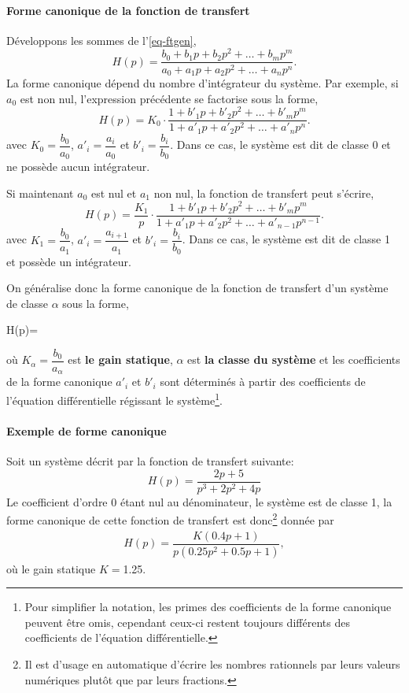 \paragraph{Forme canonique de la fonction de transfert}
Développons les sommes de l'\cref{eq-ftgen},
$$
H(p)=\dfrac{b_0+b_1p+b_2p^2+\ldots+b_mp^m}{a_0+a_1p+a_2p^2+\ldots+a_np^n}.
$$
La forme canonique dépend du nombre d'intégrateur du système. 
Par exemple, si $a_0$ est non nul, l'expression précédente se factorise sous la forme,
$$
H(p)=K_0\cdot\dfrac{1+b'_1p+b'_2p^2+\ldots+b'_mp^m}{1+a'_1p+a'_2p^2+\ldots+a'_np^n}.
$$
avec $K_0=\dfrac{b_0}{a_0}$, $a'_i=\dfrac{a_i}{a_0}$ et $b'_i=\dfrac{b_i}{b_0}$. 
Dans ce cas, le système est dit de classe 0 et ne possède aucun intégrateur.

Si maintenant $a_0$ est nul et $a_1$ non nul, la fonction de transfert peut s'écrire,
$$
H(p)=\dfrac{K_1}{p}\cdot\dfrac{1+b'_1p+b'_2p^2+\ldots+b'_mp^m}{1+a'_1p+a'_2p^2+\ldots+a'_{n-1}p^{n-1}}.
$$
avec $K_1=\dfrac{b_0}{a_1}$, $a'_i=\dfrac{a_{i+1}}{a_1}$ et $b'_i=\dfrac{b_i}{b_0}$.
Dans ce cas, le système est dit de classe 1 et possède un intégrateur.

On généralise donc la forme canonique de la fonction de transfert d'un système de classe $\alpha$ sous la forme,
\begin{bequation}
H(p)=\cdot{} \label{eq-ftcan} 
\end{bequation}
où $K_\alpha=\dfrac{b_0}{a_\alpha}$ est \textbf{le gain statique}, $\alpha$ est \textbf{la classe du système} 
et les coefficients de la forme canonique $a'_i$ et $b'_i$ sont déterminés à partir des coefficients 
de l'équation différentielle régissant le système\footnote{Pour simplifier la notation, 
les primes des coefficients de la forme canonique peuvent être omis, cependant 
ceux-ci restent toujours différents des coefficients de l'équation différentielle.}.

\paragraph{Exemple de forme canonique}
Soit un système décrit par la fonction de transfert suivante:
$$
H(p)=\dfrac{2p+5}{p^3+2p^2+4p}
$$
Le coefficient d'ordre 0 étant nul au dénominateur, le système est de classe 1, 
la forme canonique de cette fonction de transfert est 
donc\footnote{Il est d'usage en automatique d'écrire les nombres rationnels 
par leurs valeurs numériques plutôt que par leurs fractions. } donnée par
\begin{align*}
H(p)=\dfrac{K(0.4p+1)}{p(0.25p^2+0.5p+1)},
\end{align*}
où le gain statique $K=$1.25.

